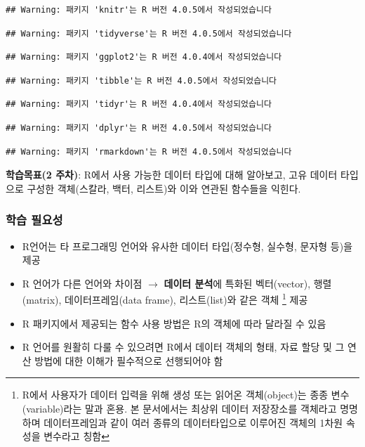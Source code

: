 \documentclass[
  11pt,
]{krantz}
\makeatletter
\providecommand{\tightlist}{%
  \setlength{\itemsep}{0pt}\setlength{\parskip}{0pt}}
\newenvironment{kframe}{%
\medskip{}
\setlength{\fboxsep}{.8em}
 \def\at@end@of@kframe{}%
 \ifinner\ifhmode%
  \def\at@end@of@kframe{\end{minipage}}%
  \begin{minipage}{\columnwidth}%
 \fi\fi%
 \def\FrameCommand##1{\hskip\@totalleftmargin \hskip-\fboxsep
 \colorbox{shadecolor}{##1}\hskip-\fboxsep
     \hskip-\linewidth \hskip-\@totalleftmargin \hskip\columnwidth}%
 \MakeFramed {\advance\hsize-\width
   \@totalleftmargin\z@ \linewidth\hsize
   \@setminipage}}%
 {\par\unskip\endMakeFramed%
 \at@end@of@kframe}
\newenvironment{rmdblock}[1]
  {
  \begin{itemize}
  \renewcommand{\labelitemi}{
    \raisebox{-.7\height}[0pt][0pt]{
      {\setkeys{Gin}{width=3em,keepaspectratio}\texttt{[image: images/\#1]}}
    }
  }
  \setlength{\fboxsep}{1em}
  \begin{kframe}
  \item
  }
  {
  \end{kframe}
  \end{itemize}
  }
\newenvironment{rmdnote}
  {\begin{rmdblock}{note}}
  {\end{rmdblock}}
\makeatother
\begin{document}
\begin{verbatim}
## Warning: 패키지 'knitr'는 R 버전 4.0.5에서 작성되었습니다
\end{verbatim}

\begin{verbatim}
## Warning: 패키지 'tidyverse'는 R 버전 4.0.5에서 작성되었습니다
\end{verbatim}

\begin{verbatim}
## Warning: 패키지 'ggplot2'는 R 버전 4.0.4에서 작성되었습니다
\end{verbatim}

\begin{verbatim}
## Warning: 패키지 'tibble'는 R 버전 4.0.5에서 작성되었습니다
\end{verbatim}

\begin{verbatim}
## Warning: 패키지 'tidyr'는 R 버전 4.0.4에서 작성되었습니다
\end{verbatim}

\begin{verbatim}
## Warning: 패키지 'dplyr'는 R 버전 4.0.5에서 작성되었습니다
\end{verbatim}

\begin{verbatim}
## Warning: 패키지 'rmarkdown'는 R 버전 4.0.5에서 작성되었습니다
\end{verbatim}

\footnotesize

\begin{rmdnote}
\textbf{학습목표(2 주차)}: R에서 사용 가능한 데이터 타입에 대해 알아보고, 고유 데이터 타입으로 구성한 객체(스칼라, 백터, 리스트)와 이와 연관된 함수들을 익힌다.
\end{rmdnote}

\normalsize

\hypertarget{ch2-abstract}{%
\subsubsection*{학습 필요성}\label{ch2-abstract}}


\begin{itemize}
\tightlist
\item
  R언어는 타 프로그래밍 언어와 유사한 데이터 타입(정수형, 실수형, 문자형 등)을 제공
\item
  R 언어가 다른 언어와 차이점 \(\rightarrow\) \textbf{데이터 분석}에 특화된 벡터(vector), 행렬(matrix),
  데이터프레임(data frame), 리스트(list)와 같은 객체 \footnote{R에서 사용자가 데이터 입력을 위해 생성 또는 읽어온 객체(object)는 종종 변수(variable)라는 말과 혼용.
    본 문서에서는 최상위 데이터 저장장소를 객체라고 명명하며 데이터프레임과 같이 여러 종류의 데이터타입으로 이루어진 객체의 1차원 속성을 변수라고 칭함} 제공
\item
  R 패키지에서 제공되는 함수 사용 방법은 R의 객체에 따라 달라질 수 있음\\
\item
  R 언어를 원활히 다룰 수 있으려면 R에서 데이터 객체의 형태, 자료 할당 및 그 연산 방법에 대한 이해가 필수적으로 선행되어야 함
\end{itemize}
\end{document}
